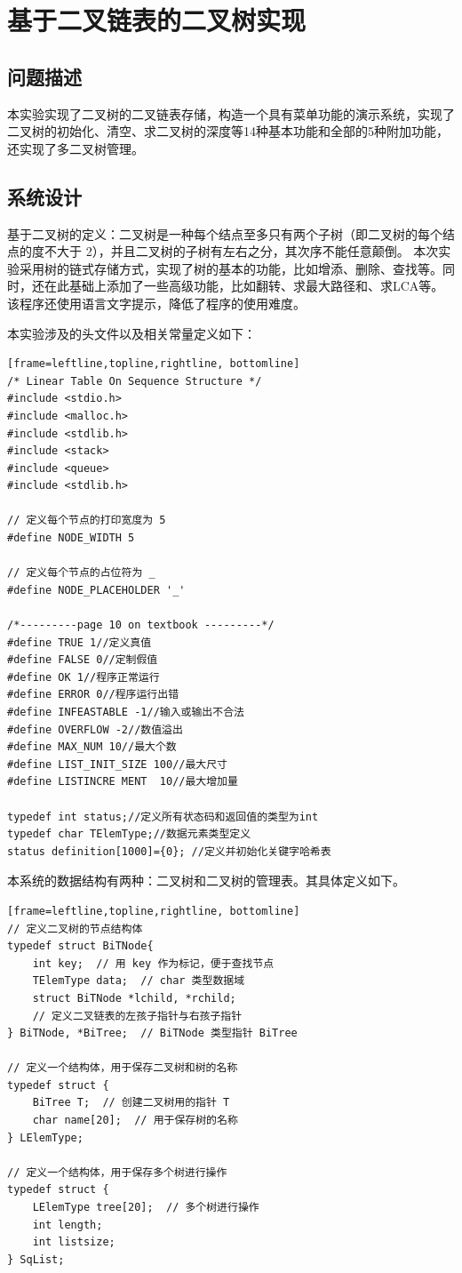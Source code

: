 \documentclass[supercite]{Experimental_Report}
\theoremstyle{definition}
\begin{document}
\section{基于二叉链表的二叉树实现}


\subsection{问题描述}

本实验实现了二叉树的二叉链表存储，构造一个具有菜单功能的演示系统，实现了二叉树的初始化、清空、求二叉树的深度等14种基本功能和全部的5种附加功能，还实现了多二叉树管理。

\subsection{系统设计}
基于二叉树的定义：二叉树是一种每个结点至多只有两个子树（即二叉树的每个结点的度不大于 2），并且二叉树的子树有左右之分，其次序不能任意颠倒。
本次实验采用树的链式存储方式，实现了树的基本的功能，比如增添、删除、查找等。同时，还在此基础上添加了一些高级功能，比如翻转、求最大路径和、求LCA等。该程序还使用语言文字提示，降低了程序的使用难度。

本实验涉及的头文件以及相关常量定义如下：
\begin{lstlisting}[title = 相关常量定义][frame=leftline,topline,rightline, bottomline]
/* Linear Table On Sequence Structure */
#include <stdio.h>
#include <malloc.h>
#include <stdlib.h>
#include <stack>
#include <queue>
#include <stdlib.h>

// 定义每个节点的打印宽度为 5
#define NODE_WIDTH 5

// 定义每个节点的占位符为 _
#define NODE_PLACEHOLDER '_'

/*---------page 10 on textbook ---------*/
#define TRUE 1//定义真值 
#define FALSE 0//定制假值 
#define OK 1//程序正常运行 
#define ERROR 0//程序运行出错 
#define INFEASTABLE -1//输入或输出不合法 
#define OVERFLOW -2//数值溢出 
#define MAX_NUM 10//最大个数 
#define LIST_INIT_SIZE 100//最大尺寸 
#define LISTINCRE MENT  10//最大增加量 

typedef int status;//定义所有状态码和返回值的类型为int
typedef char TElemType;//数据元素类型定义
status definition[1000]={0}; //定义并初始化关键字哈希表 
\end{lstlisting}
本系统的数据结构有两种：二叉树和二叉树的管理表。其具体定义如下。
\begin{lstlisting}[title = 相关数据结构定义][frame=leftline,topline,rightline, bottomline]
// 定义二叉树的节点结构体
typedef struct BiTNode{
	int key;  // 用 key 作为标记，便于查找节点
	TElemType data;  // char 类型数据域
	struct BiTNode *lchild, *rchild;  
	// 定义二叉链表的左孩子指针与右孩子指针
} BiTNode, *BiTree;  // BiTNode 类型指针 BiTree

// 定义一个结构体，用于保存二叉树和树的名称
typedef struct {
	BiTree T;  // 创建二叉树用的指针 T
	char name[20];  // 用于保存树的名称
} LElemType;

// 定义一个结构体，用于保存多个树进行操作
typedef struct {
	LElemType tree[20];  // 多个树进行操作
	int length;
	int listsize;
} SqList;
\end{lstlisting}
\end{document}
